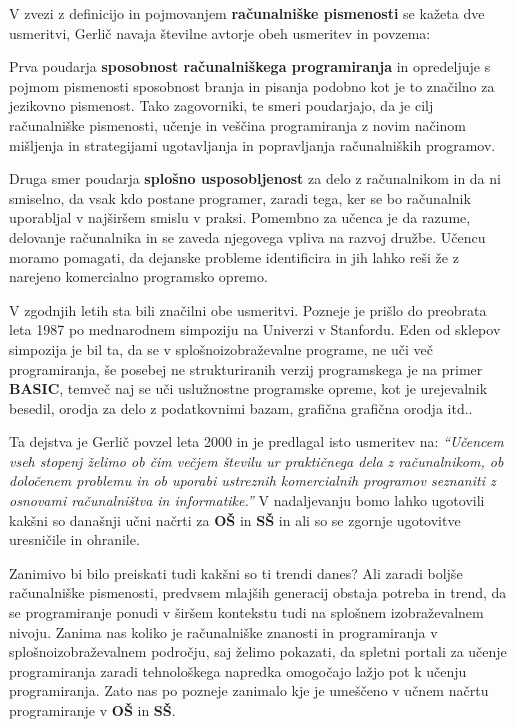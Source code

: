 V zvezi z definicijo in pojmovanjem \textbf{računalniške pismenosti}
se kažeta dve usmeritvi, Gerlič \cite{gerlic_2000} navaja številne
avtorje obeh usmeritev in povzema:

Prva poudarja \textbf{sposobnost računalniškega programiranja} in
opredeljuje s pojmom pismenosti sposobnost branja in pisanja
podobno kot je to značilno za jezikovno pismenost. Tako zagovorniki,
te smeri poudarjajo, da je cilj računalniške pismenosti, učenje in
veščina programiranja z novim načinom mišljenja in strategijami
ugotavljanja in popravljanja računalniških programov.

Druga smer poudarja \textbf{splošno usposobljenost} za delo z
računalnikom in da ni smiselno, da vsak kdo postane programer, zaradi
tega, ker se bo računalnik uporabljal v najširšem smislu v
praksi. Pomembno za učenca je da razume, delovanje računalnika in se
zaveda njegovega vpliva na razvoj družbe. Učencu moramo pomagati, da
dejanske probleme identificira in jih lahko reši že z narejeno
komercialno programsko opremo.

V zgodnjih letih sta bili značilni obe usmeritvi. Pozneje je prišlo do
preobrata leta 1987 po mednarodnem simpoziju na Univerzi v
Stanfordu. Eden od sklepov simpozija je bil ta, da se v
splošnoizobraževalne programe, ne uči več programiranja, še posebej ne
strukturiranih verzij programskega je na primer \textbf{BASIC}, temveč
naj se uči uslužnostne programske opreme, kot je urejevalnik besedil,
orodja za delo z podatkovnimi bazam, grafična grafična orodja itd..



Ta dejstva je Gerlič \cite{gerlic_2000} povzel leta 2000 in je
predlagal isto usmeritev na: \emph{``Učencem vseh stopenj želimo ob
  čim večjem številu ur praktičnega dela z računalnikom, ob določenem
  problemu in ob uporabi ustreznih komercialnih programov seznaniti z
  osnovami računalništva in informatike.''} V nadaljevanju bomo lahko
ugotovili kakšni so današnji učni načrti za \textbf{OŠ} in \textbf{SŠ}
in ali so se zgornje ugotovitve uresničile in ohranile.

Zanimivo bi bilo preiskati tudi kakšni so ti trendi danes? Ali zaradi
boljše računalniške pismenosti, predvsem mlajših generacij obstaja
potreba in trend, da se programiranje ponudi v širšem kontekstu tudi
na splošnem izobraževalnem nivoju.  Zanima nas koliko je računalniške
znanosti in programiranja v splošnoizobraževalnem področju, saj želimo
pokazati, da spletni portali za učenje programiranja zaradi
tehnološkega napredka omogočajo lažjo pot k učenju programiranja. Zato
nas po pozneje zanimalo kje je umeščeno v učnem načrtu programiranje v
\textbf{OŠ} in \textbf{SŠ}.

